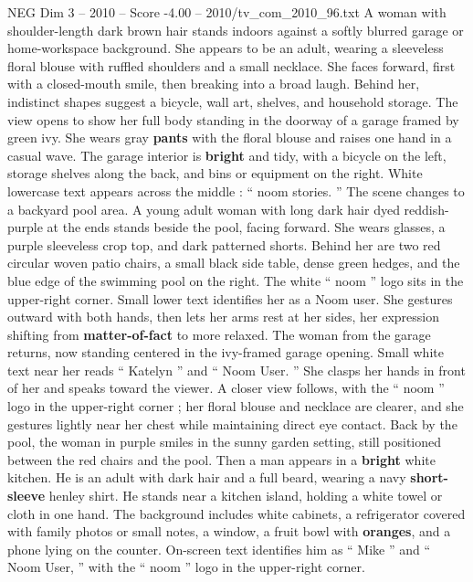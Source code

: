 \begin{textsample}{NEG Dim 3 – 2010 – Score -4.00 – 2010/tv\_com\_2010\_96.txt}  \label{ex:f3_neg_002}
A woman with shoulder-length dark brown hair stands indoors against a softly blurred garage or home-workspace background.
She appears to be an adult, wearing a sleeveless floral blouse with ruffled shoulders and a small necklace.
She faces forward, first with a closed-mouth smile, then breaking into a broad laugh.
Behind her, indistinct shapes suggest a bicycle, wall art, shelves, and household storage.
The view opens to show her full body standing in the doorway of a garage framed by green ivy.
She wears gray \textbf{pants} with the floral blouse and raises one hand in a casual wave.
The garage interior is \textbf{bright} and tidy, with a bicycle on the left, storage shelves along the back, and bins or equipment on the right.
White lowercase text appears across the middle : “ noom stories. ” The scene changes to a backyard pool area.
A young adult woman with long dark hair dyed reddish-purple at the ends stands beside the pool, facing forward.
She wears glasses, a purple sleeveless crop top, and dark patterned shorts.
Behind her are two red circular woven patio chairs, a small black side table, dense green hedges, and the blue edge of the swimming pool on the right.
The white “ noom ” logo sits in the upper-right corner.
Small lower text identifies her as a Noom user.
She gestures outward with both hands, then lets her arms rest at her sides, her expression shifting from \textbf{matter-of-fact} to more relaxed.
The woman from the garage returns, now standing centered in the ivy-framed garage opening.
Small white text near her reads “ Katelyn ” and “ Noom User. ” She clasps her hands in front of her and speaks toward the viewer.
A closer view follows, with the “ noom ” logo in the upper-right corner ; her floral blouse and necklace are clearer, and she gestures lightly near her chest while maintaining direct eye contact.
Back by the pool, the woman in purple smiles in the sunny garden setting, still positioned between the red chairs and the pool.
Then a man appears in a \textbf{bright} white kitchen.
He is an adult with dark hair and a full beard, wearing a navy \textbf{short-sleeve} henley shirt.
He stands near a kitchen island, holding a white towel or cloth in one hand.
The background includes white cabinets, a refrigerator covered with family photos or small notes, a window, a fruit bowl with \textbf{oranges}, and a phone lying on the counter.
On-screen text identifies him as “ Mike ” and “ Noom User, ” with the “ noom ” logo in the upper-right corner.

\end{textsample}
